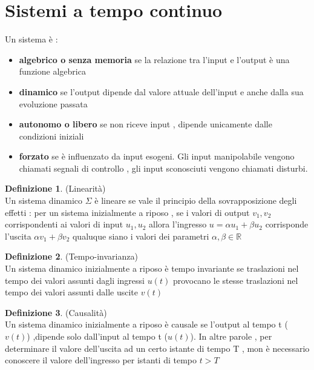 \documentclass{article}
\theoremstyle{definition}
\newtheorem*{definizione}{Definizione}
\newcommand{\R}{\mathbb{R}}
\begin{document}
\section{Sistemi a tempo continuo}
\begin{center}
\end{center}
Un sistema è :
\begin{itemize}
	\item \textbf{algebrico o senza memoria} se la relazione tra l'input e l'output è una funzione algebrica
	\item \textbf{dinamico} se l'output dipende dal valore attuale dell'input e anche dalla sua evoluzione passata 
	\item \textbf{autonomo o libero} se non riceve input , dipende unicamente dalle condizioni iniziali 
	\item \textbf{forzato} se è influenzato da input esogeni. Gli input manipolabile vengono chiamati segnali di controllo , gli input sconosciuti vengono chiamati disturbi.
\end{itemize}
\begin{definizione} (Linearità)
	\\ Un sistema dinamico $\Sigma$ è lineare se vale il principio della sovrapposizione degli effetti : per un sistema inizialmente a riposo , se i valori di output $v_1 , v_2$ corrispondenti ai valori di input $u_1,u_2$ allora l'ingresso $u=\alpha u_1 + \beta u_2$ corrisponde l'uscita $\alpha v_1 + \beta v_2$ qualuque siano i valori dei parametri $\alpha , \beta \in \R$
\end{definizione}
\begin{definizione}(Tempo-invarianza)\\
	Un sistema dinamico inizialmente a riposo è tempo invariante se traslazioni nel tempo dei valori assunti dagli ingressi $u(t)$ provocano le stesse traslazioni nel tempo dei valori assunti dalle uscite $v(t)$
\end{definizione}
\begin{definizione}(Causalità)\\
	Un sistema dinamico inizialmente a riposo è causale se l'output al tempo t ($v(t)$) ,dipende solo dall'input al tempo t ($u(t)$). In altre parole , per determinare il valore dell'uscita ad un certo istante di tempo T , mon è necessario conoscere il valore dell'ingresso per istanti di tempo $t > T$
\end{definizione}
\end{document}
